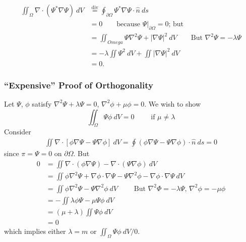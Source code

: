 \documentclass{article}
\newcommand{\nhat}{\hat{n}}
\begin{document}
\begin{align*}
\iint_{\Omega} \nabla \cdot (\Psi^{\ast} \nabla \Psi)~dV
&\stackrel{\text{div}}{=} \oint_{\partial \Omega} \Psi^{\ast} \nabla \Psi \cdot
\nhat~ds \\ &= 0 \qquad \text{because $\Psi |_{\partial \Omega} = 0$; but} \\&=
\iint_{Omega} \Psi \nabla^2 \Psi + |\nabla \Psi|^2~dV \qquad \text{But $\nabla^2
    \Psi = - \lambda \Psi$} \\ &= - \lambda \iint \Psi^2~dV + \iint|\nabla
    \Psi|^2~dV \\ &= 0.
\end{align*}    
\xprf
\subsubsection{``Expensive'' Proof of Orthogonality}
Let $\Psi$, $\phi$ satisfy $\nabla^2 \Psi + \lambda \Psi = 0$, $\nabla^2 \phi
    + \mu \phi = 0$. We wish to show
\[ \iint_\Omega \Psi \phi~dV = 0 \qquad \text{ if } \mu \neq \lambda\]
\prf
Consider
\begin{align*}
\iint \nabla \cdot [\phi \nabla \Psi - \Psi \nabla \phi]~dV = \oint (\phi
        \nabla \Psi - \Psi \nabla \phi) \cdot \nhat~ds
    = 0
\end{align*}
since $\pi = \Psi = 0$ on $\partial \Omega$. But
\begin{align*}
0 &= \iint \nabla \cdot (\phi \nabla \Psi) - \nabla \cdot ( \Psi \nabla \phi)~dV
    \\
  &= \iint \phi \nabla^2 \Psi + \nabla \phi \cdot \nabla \Psi - \Psi \nabla^2
  \phi - \nabla \phi \cdot \nabla \Psi~dV \\
  &= \iint \phi \nabla^2 \Psi - \Psi \nabla^2 \phi ~dV \qquad \text{ But
      $\nabla^2 \Phi = - \lambda \Psi$, $\nabla^2 \phi = - \mu \phi$} \\
  &= - \iint \lambda \phi \Psi - \mu \Psi \phi~dV \\
  &= (\mu + \lambda) \iint \Psi \phi ~dV \\
  &= 0
\end{align*}
which implies either $\lambda = m$ or $\iint_{\Omega} \Psi \phi~dV / 0$.
\xprf
\end{document}
